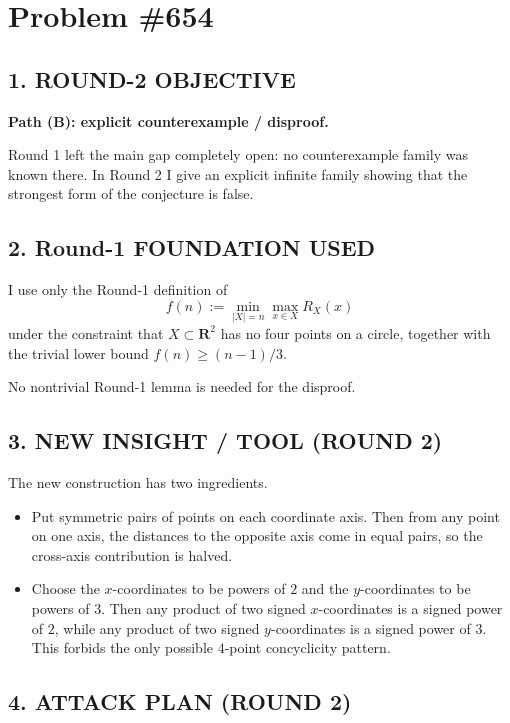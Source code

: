 \section{Problem \#654}

\subsection*{1. ROUND-2 OBJECTIVE}

\textbf{Path (B): explicit counterexample / disproof.}

Round 1 left the main gap completely open: no counterexample family was known there.  In Round 2 I give an explicit infinite family showing that the strongest form of the conjecture is false.

\subsection*{2. Round-1 FOUNDATION USED}

I use only the Round-1 definition of
\[
f(n):=\min_{|X|=n}\max_{x\in X} R_X(x)
\]
under the constraint that $X\subset \mathbf{R}^2$ has no four points on a circle, together with the trivial lower bound $f(n)\ge (n-1)/3$.

No nontrivial Round-1 lemma is needed for the disproof.

\subsection*{3. NEW INSIGHT / TOOL (ROUND 2)}

The new construction has two ingredients.

\begin{itemize}
\item Put symmetric pairs of points on each coordinate axis.  Then from any point on one axis, the distances to the opposite axis come in equal pairs, so the cross-axis contribution is halved.
\item Choose the $x$-coordinates to be powers of $2$ and the $y$-coordinates to be powers of $3$.  Then any product of two signed $x$-coordinates is a signed power of $2$, while any product of two signed $y$-coordinates is a signed power of $3$.  This forbids the only possible $4$-point concyclicity pattern.
\end{itemize}

\subsection*{4. ATTACK PLAN (ROUND 2)}

